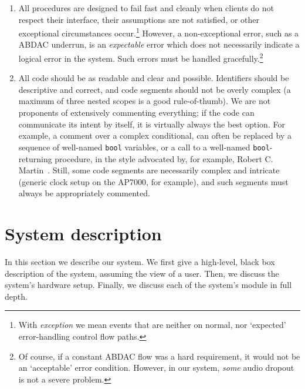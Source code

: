 \documentclass[a4paper,9pt]{article}
\newcommand{\isrc}[1]{\texttt{#1}}
\begin{document}
{\begin{enumerate}
    \item All procedures are designed to fail fast and cleanly when clients do
    not respect their interface, their assumptions are not satisfied, or other
    exceptional circumstances occur.\footnote{With \emph{exception} we mean
    events that are neither on normal, nor `expected' error-handling control
    flow paths.}
    However, a non-exceptional error,
    such as a ABDAC underrun, is an \emph{expectable} error which does not
    necessarily indicate a logical error in the system. Such errors must be
    handled gracefully.\footnote{Of course, if a constant ABDAC flow was a
    hard requirement, it would not be an `acceptable' error condition.
    However, in our system, \emph{some} audio dropout is not a severe
    problem.}

    \item All code should be as readable and clear and possible. 
    Identifiers should be descriptive and correct, and code segments
    should not be overly complex (a maximum of three nested scopes is a good
    rule-of-thumb). We are not proponents of extensively commenting
    everything; if the code can communicate its intent by itself, it is
    virtually always the best option.  For example, a comment over a complex
    conditional, can often be replaced by a sequence of well-named \isrc{bool}
    variables, or a call to a well-named \isrc{bool}-returning procedure, in
    the style advocated by, for example, Robert C.  Martin~\cite{cleancode}.
    Still, some code segments are necessarily complex and intricate (generic
    clock setup on the AP7000, for example), and such segments must
    always be appropriately commented. 
\end{enumerate}
}


\section{System description}
\label{sec:implementation}

In this section we describe our system. We first give a high-level, black box
description of the system, assuming the view of a user. Then, we discuss the
system's hardware setup. Finally, we discuss each of the system's module in
full depth.
\end{document}
